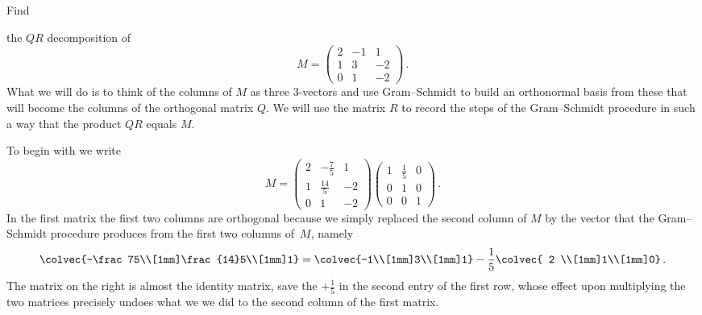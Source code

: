 \begin{example}
\hypertarget{methodQR}{Find} the $QR$ decomposition of \[M=\begin{pmatrix}2&-1&1\\1&3&-2\\0&1&-2\end{pmatrix}\, .\]
What we will do is to think of the columns of $M$ as three 3-vectors and use Gram--Schmidt to
build an orthonormal basis from these that will become the columns of the orthogonal matrix $Q$.
We will use the matrix $R$ to record the steps of the Gram--Schmidt procedure in such a way
that the product $QR$ equals $M$. 

To begin with we write
\[
M=\begin{pmatrix}2&-\frac75&1\\[1mm]1&\frac{14}5&-2\\[1mm]0&1&-2\end{pmatrix}
\begin{pmatrix}1&\frac15&0\\[1mm]0&1&0\\[1mm]0&0&1\end{pmatrix}\, .
\]
In the first matrix the first two columns are  orthogonal because we simply replaced the second column of $M$ by the vector that the Gram--Schmidt
procedure produces from the first two columns of~$M$, namely
\[
\colvec{-\frac75\\[1mm]\frac{14}5\\[1mm]1}=\colvec{-1\\[1mm]3\\[1mm]1}-\frac15
\colvec{ 2 \\[1mm]1\\[1mm]0}\, .
\]
 The matrix on the right is almost the identity
matrix, save the $+\frac15$ in the second entry of the first row, whose effect upon multiplying the
two matrices precisely undoes what we we did to the second column of the first matrix. 


\end{example}
